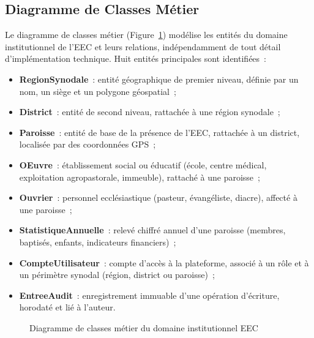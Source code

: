 \documentclass[12pt, a4paper]{report}
\begin{document}
\subsection{Diagramme de Classes Métier}
\label{ssec:classes-metier}

Le diagramme de classes métier (Figure~\ref{fig:diag-classes-metier}) modélise
les entités du domaine institutionnel de l'EEC et leurs relations, indépendamment
de tout détail d'implémentation technique. Huit entités principales sont
identifiées~:

\begin{itemize}[itemsep=2pt, topsep=4pt, leftmargin=1.5cm]
  \item \textbf{RegionSynodale}~: entité géographique de premier niveau, définie
    par un nom, un siège et un polygone géospatial~;
  \item \textbf{District}~: entité de second niveau, rattachée à une région
    synodale~;
  \item \textbf{Paroisse}~: entité de base de la présence de l'EEC, rattachée à
    un district, localisée par des coordonnées GPS~;
  \item \textbf{OEuvre}~: établissement social ou éducatif (école, centre
    médical, exploitation agropastorale, immeuble), rattaché à une paroisse~;
  \item \textbf{Ouvrier}~: personnel ecclésiastique (pasteur, évangéliste,
    diacre), affecté à une paroisse~;
  \item \textbf{StatistiqueAnnuelle}~: relevé chiffré annuel d'une paroisse
    (membres, baptisés, enfants, indicateurs financiers)~;
  \item \textbf{CompteUtilisateur}~: compte d'accès à la plateforme, associé
    à un rôle et à un périmètre synodal (région, district ou paroisse)~;
  \item \textbf{EntreeAudit}~: enregistrement immuable d'une opération
    d'écriture, horodaté et lié à l'auteur.
\end{itemize}

\begin{figure}[H]
  \centering
  \caption{Diagramme de classes métier du domaine institutionnel EEC}
  \label{fig:diag-classes-metier}
\end{figure}
\end{document}
